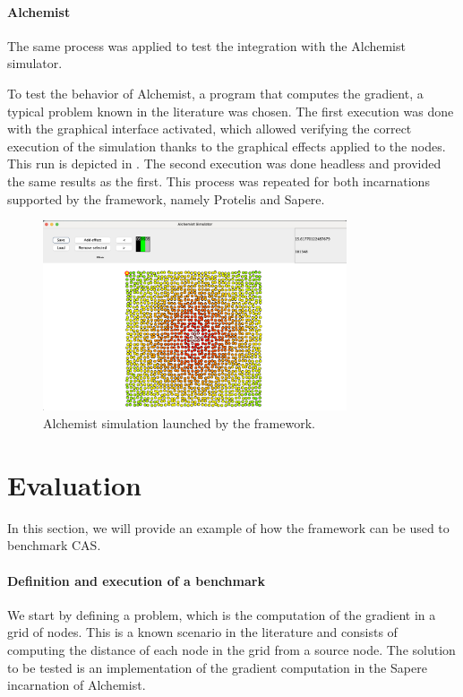 \documentclass[12pt,a4paper,openright,twoside]{book}
\begin{document}
\paragraph*{Alchemist}
The same process was applied to test the integration with the Alchemist simulator.

To test the behavior of Alchemist, a program that computes the gradient, a typical problem known in the literature was chosen. 
The first execution was done with the graphical interface activated, which allowed verifying the correct execution of the simulation thanks to the graphical effects applied to the nodes.
This run is depicted in . The second execution was done headless and provided the same results as the first. This process was repeated for both incarnations supported by the framework, namely Protelis and Sapere.

\begin{figure}[h!]
  \centering
  \includegraphics[width=0.8\textwidth]{figures/gradient-execution.png}
  \caption{Alchemist simulation launched by the framework.}
  \label{fig:alchemist-sim}
\end{figure}

\section{Evaluation}

In this section, we will provide an example of how the framework can be used to benchmark \ac*{CAS}.

\paragraph*{Definition and execution of a benchmark}

We start by defining a problem, which is the computation of the gradient in a grid of nodes.
This is a known scenario in the literature and consists of computing the distance of each node in the grid from a source node.
The solution to be tested is an implementation of the gradient computation in the Sapere incarnation of Alchemist.
\end{document}
